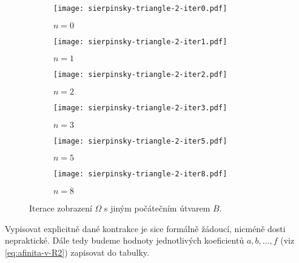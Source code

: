\begin{figure}[h]
    \centering
    \begin{subfigure}{0.45\textwidth}
        \centering
        \texttt{[image: sierpinsky-triangle-2-iter0.pdf]}
        \begin{center}
            $n=0$
        \end{center}
    \end{subfigure}
    \qquad
    \vspace{1cm}
    \begin{subfigure}{0.45\textwidth}
        \centering
        \texttt{[image: sierpinsky-triangle-2-iter1.pdf]}
        \begin{center}
            $n=1$
        \end{center}
    \end{subfigure}
    \qquad
    \begin{subfigure}{0.45\textwidth}
        \centering
        \texttt{[image: sierpinsky-triangle-2-iter2.pdf]}
        \begin{center}
            $n=2$
        \end{center}
    \end{subfigure}
    \qquad
    \vspace{1cm}
    \begin{subfigure}{0.45\textwidth}
        \centering
        \texttt{[image: sierpinsky-triangle-2-iter3.pdf]}
        \begin{center}
            $n=3$
        \end{center}
    \end{subfigure}
    \qquad
    \begin{subfigure}{0.45\textwidth}
        \centering
        \texttt{[image: sierpinsky-triangle-2-iter5.pdf]}
        \begin{center}
            $n=5$
        \end{center}
    \end{subfigure}
    \qquad
    \begin{subfigure}{0.45\textwidth}
        \centering
        \texttt{[image: sierpinsky-triangle-2-iter8.pdf]}
        \begin{center}
            $n=8$
        \end{center}
    \end{subfigure}
    \caption{Iterace zobrazení $\Omega$ s jiným počátečním útvarem $B$.}
    \label{fig:iterace-zobrazeni-omega-sierpinskeho-trojuhelnik-jiny-poc-utvar}
\end{figure}
Vypisovat explicitně dané kontrakce je sice formálně žádoucí, nicméně dosti nepraktické. Dále tedy budeme hodnoty jednotlivých koeficientů $a,b,\ldots,f$ (viz \eqref{eq:afinita-v-R2}) zapisovat do tabulky.